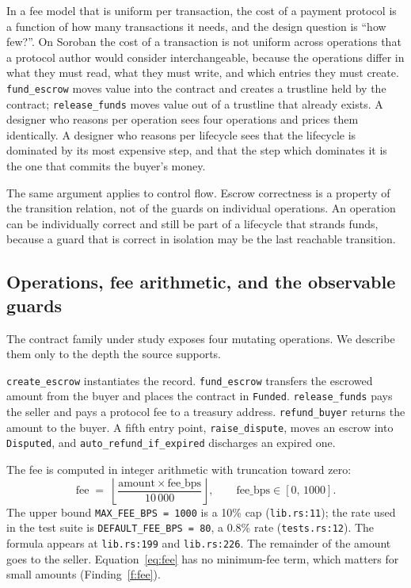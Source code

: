 \documentclass[sigconf,review]{acmart}
\begin{document}
In a fee model that is uniform per transaction, the cost of a payment protocol
is a function of how many transactions it needs, and the design question is
``how few?''. On Soroban the cost of a transaction is not uniform across
operations that a protocol author would consider interchangeable, because the
operations differ in what they must read, what they must write, and which
entries they must create. \texttt{fund\_escrow} moves value into the contract
and creates a trustline held by the contract; \texttt{release\_funds} moves
value out of a trustline that already exists. A designer who reasons per
operation sees four operations and prices them identically. A designer who
reasons per lifecycle sees that the lifecycle is dominated by its most
expensive step, and that the step which dominates it is the one that commits
the buyer's money.

The same argument applies to control flow. Escrow correctness is a property of
the transition relation, not of the guards on individual operations. An
operation can be individually correct and still be part of a lifecycle that
strands funds, because a guard that is correct in isolation may be the last
reachable transition.

\subsection{Operations, fee arithmetic, and the observable guards}

The contract family under study exposes four mutating operations. We describe
them only to the depth the source supports.

\texttt{create\_escrow} instantiates the record. \texttt{fund\_escrow}
transfers the escrowed amount from the buyer and places the contract in
\texttt{Funded}. \texttt{release\_funds} pays the seller and pays a protocol
fee to a treasury address. \texttt{refund\_buyer} returns the amount to the
buyer. A fifth entry point, \texttt{raise\_dispute}, moves an escrow into
\texttt{Disputed}, and \texttt{auto\_refund\_if\_expired} discharges an expired
one.

The fee is computed in integer arithmetic with truncation toward zero:
\begin{equation}
\label{eq:fee}
\mathrm{fee} \;=\; \left\lfloor \frac{\mathrm{amount} \times \mathrm{fee\_bps}}{10\,000} \right\rfloor ,
\qquad \mathrm{fee\_bps} \in [0,\, 1000].
\end{equation}
The upper bound \texttt{MAX\_FEE\_BPS = 1000} is a 10\% cap
(\texttt{lib.rs:11}); the rate used in the test suite is
\texttt{DEFAULT\_FEE\_BPS = 80}, a 0.8\% rate (\texttt{tests.rs:12}). The
formula appears at \texttt{lib.rs:199} and \texttt{lib.rs:226}. The remainder
of the amount goes to the seller. Equation~\ref{eq:fee} has no minimum-fee
term, which matters for small amounts (Finding~\ref{f:fee}).
\end{document}
